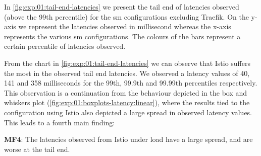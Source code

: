 In \cref{fig:exp:01:tail-end-latencies} we present the tail end of latencies observed (above the 99th percentile) for the \gls{sm} configurations excluding Traefik. On the y-axis we represent the latencies observed in millisecond whereas the x-axis represents the various \gls{sm} configurations. The colours of the bars represent a certain percentile of latencies observed.

From the chart in \cref{fig:exp:01:tail-end-latencies} we can observe that Istio suffers the most in the observed tail end latencies. We observed a latency values of 40, 141 and 358 milliseconds for the 99th, 99.9th and 99.99th percentiles respectively. This observation is a continuation from the behaviour depicted in the box and whiskers plot (\cref{fig:exp:01:boxplots-latency:linear}), where the results tied to the configuration using Istio also depicted a large spread in observed latency values. This leads to a fourth main finding:

\begin{shaded*}
    \noindent
    \textbf{MF4}: 
    The latencies observed from Istio under load have a large spread, and are worse at the tail end.
\end{shaded*}

